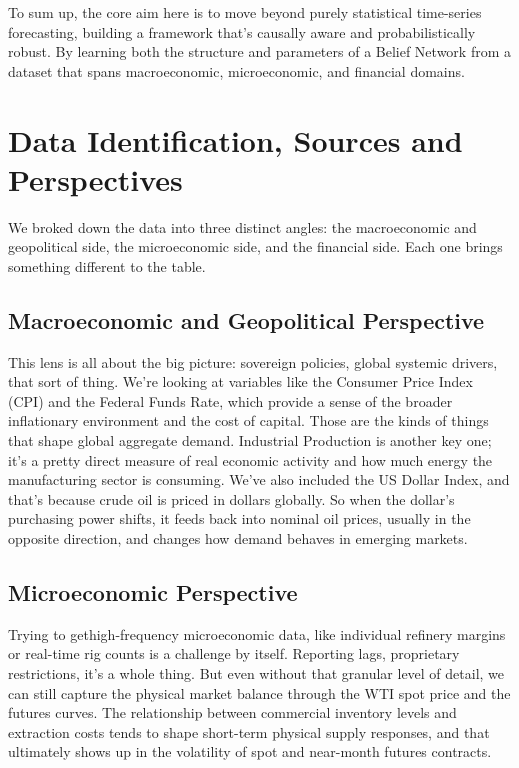 \documentclass[11pt,a4paper]{article}
\begin{document}
To sum up, the core aim here is to move beyond purely statistical time-series 
forecasting, building a framework that's causally aware and probabilistically robust. 
By learning both the structure and parameters of a Belief Network from a 
dataset that spans macroeconomic, microeconomic, and financial domains.










\section{Data Identification, Sources and Perspectives}

We broked down the data  
into three distinct angles: the macroeconomic and geopolitical side, 
the microeconomic side, and the financial side. Each one brings 
something different to the table.

\subsection{Macroeconomic and Geopolitical Perspective}

This lens is all about the big picture: sovereign policies, 
global systemic drivers, that sort of thing. We're looking at variables 
like the Consumer Price Index (CPI) and the Federal Funds Rate, which 
provide a sense of the broader inflationary environment and the cost of capital. 
Those are the kinds of things that shape global aggregate demand. Industrial 
Production is another key one; it's a pretty direct measure of real 
economic activity and how much energy the manufacturing sector is consuming. 
We've also included the US Dollar Index, and that's because crude oil is priced 
in dollars globally. So when the dollar's purchasing power shifts, it 
feeds back into nominal oil prices, usually in the opposite direction, 
and changes how demand behaves in emerging markets.

\subsection{Microeconomic Perspective}

Trying to gethigh-frequency microeconomic data, like individual 
refinery margins or real-time rig counts is a challenge by itself. 
Reporting lags, proprietary restrictions, it's a whole thing. But even without 
that granular level of detail, we can still capture the physical market balance 
through the WTI spot price and the futures curves. The relationship between 
commercial inventory levels and extraction costs tends to shape short-term 
physical supply responses, and that ultimately shows up in the volatility of 
spot and near-month futures contracts.
\end{document}
